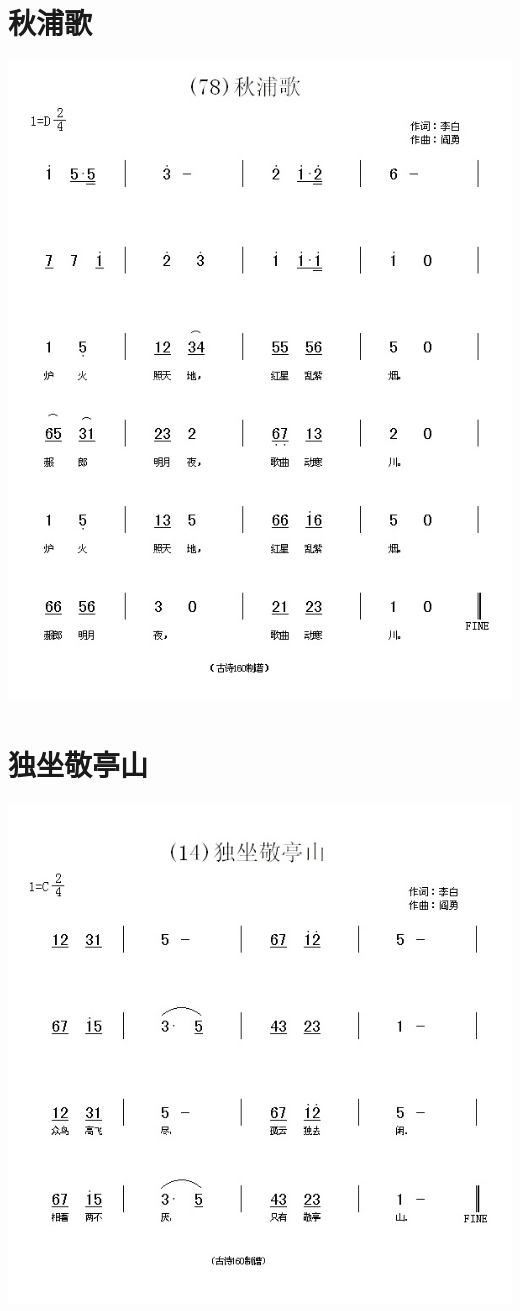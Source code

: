 \documentclass[cn,pad,twocol]{elegantbook}
\begin{document}
\section{秋浦歌}
    \includegraphics[width=\textwidth]{dongxiao/20200808-秋浦歌-李白.jpg}
\section{独坐敬亭山}
    \includegraphics[width=\textwidth]{dongxiao/20200808-独坐敬亭山-李白.jpg}
\end{document}
